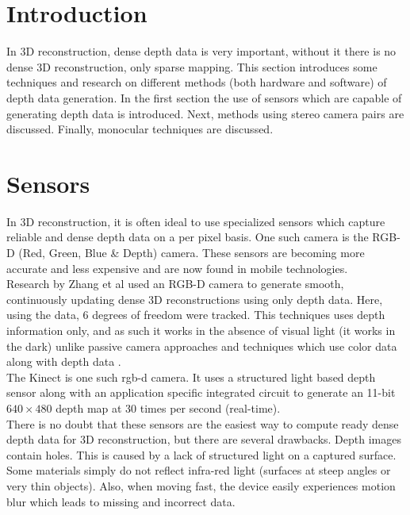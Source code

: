 \section{Introduction}

In 3D reconstruction, dense depth data is very important, without it there is no dense 3D reconstruction, only sparse mapping. This section introduces some techniques and research on different methods (both hardware and software) of depth data generation. In the first section the use of sensors which are capable of generating depth data is introduced. Next, methods using stereo camera pairs are discussed. Finally, monocular techniques are discussed. \\


\section{Sensors}

In 3D reconstruction, it is often ideal to use specialized sensors which capture reliable and dense depth data on a per pixel basis. One such camera is the RGB-D (Red, Green, Blue \& Depth) camera. These sensors are becoming more accurate and less expensive and are now found in mobile technologies. \\

Research by Zhang et al \cite{Zhang12Microsoft} used an RGB-D camera to generate smooth, continuously updating dense 3D reconstructions using only depth data. Here, using the data, 6 degrees of freedom were tracked. This techniques uses depth information only, and as such it works in the absence of visual light (it works in the dark) unlike passive camera approaches \cite{Klein07Parallel, Newcombe10Live,Stuhmer10Real} and techniques which use color data along with depth data \cite{Henry10Rgb}. \\

The Kinect is one such rgb-d camera. It uses a structured light based depth sensor along with an application specific integrated circuit to generate an 11-bit $640\times 480$ depth map at 30 times per second (real-time). \\

There is no doubt that these sensors are the easiest way to compute ready dense depth data for 3D reconstruction, but there are several drawbacks. Depth images contain holes. This is caused by a lack of structured light on a captured surface. Some materials simply do not reflect infra-red light (surfaces at steep angles or very thin objects). Also, when moving fast, the device easily experiences motion blur which leads to missing and incorrect data. \\

